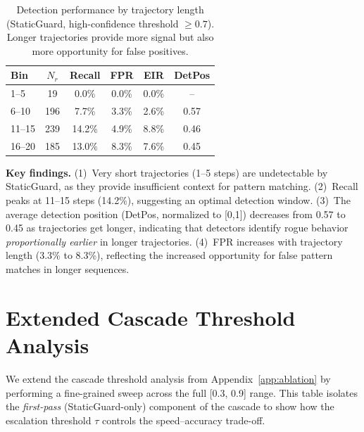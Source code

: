 \documentclass{article}
\begin{document}
\begin{table}[h]
\caption{Detection performance by trajectory length (StaticGuard, high-confidence threshold $\geq 0.7$). Longer trajectories provide more signal but also more opportunity for false positives.}
\label{tab:length}
\vskip 0.15in
\begin{center}
\begin{small}
\begin{sc}
\begin{tabular}{lccccc}
\toprule
Bin & $N_r$ & Recall & FPR & EIR & DetPos \\
\midrule
1--5 & 19 & 0.0\% & 0.0\% & 0.0\% & -- \\
6--10 & 196 & 7.7\% & 3.3\% & 2.6\% & 0.57 \\
11--15 & 239 & 14.2\% & 4.9\% & 8.8\% & 0.46 \\
16--20 & 185 & 13.0\% & 8.3\% & 7.6\% & 0.45 \\
\bottomrule
\end{tabular}
\end{sc}
\end{small}
\end{center}
\vskip -0.1in
\end{table}

\textbf{Key findings.} (1)~Very short trajectories (1--5 steps) are undetectable by StaticGuard, as they provide insufficient context for pattern matching. (2)~Recall peaks at 11--15 steps (14.2\%), suggesting an optimal detection window. (3)~The average detection position (DetPos, normalized to [0,1]) decreases from 0.57 to 0.45 as trajectories get longer, indicating that detectors identify rogue behavior \emph{proportionally earlier} in longer trajectories. (4)~FPR increases with trajectory length (3.3\% to 8.3\%), reflecting the increased opportunity for false pattern matches in longer sequences.

\section{Extended Cascade Threshold Analysis}
\label{app:threshold}

We extend the cascade threshold analysis from Appendix~\ref{app:ablation} by performing a fine-grained sweep across the full [0.3, 0.9] range. This table isolates the \emph{first-pass} (StaticGuard-only) component of the cascade to show how the escalation threshold $\tau$ controls the speed--accuracy trade-off.
\end{document}
